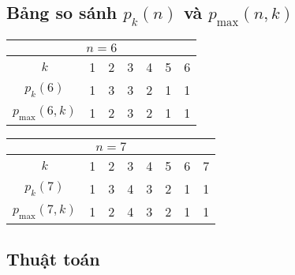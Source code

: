 \documentclass[12pt,a4paper]{article}
\theoremstyle{definition}
\begin{document}
\subsection{Bảng so sánh $p_k(n)$ và $p_{\max}(n,k)$}

\begin{center}
\begin{tabular}{|c|c|c|c|c|c|c|}
\hline
\multicolumn{7}{|c|}{$n = 6$} \\
\hline
$k$ & 1 & 2 & 3 & 4 & 5 & 6 \\
\hline
$p_k(6)$ & 1 & 3 & 3 & 2 & 1 & 1 \\
\hline
$p_{\max}(6,k)$ & 1 & 2 & 3 & 2 & 1 & 1 \\
\hline
\end{tabular}
\end{center}

\begin{center}
\begin{tabular}{|c|c|c|c|c|c|c|c|}
\hline
\multicolumn{8}{|c|}{$n = 7$} \\
\hline
$k$ & 1 & 2 & 3 & 4 & 5 & 6 & 7 \\
\hline
$p_k(7)$ & 1 & 3 & 4 & 3 & 2 & 1 & 1 \\
\hline
$p_{\max}(7,k)$ & 1 & 2 & 4 & 3 & 2 & 1 & 1 \\
\hline
\end{tabular}
\end{center}

\subsection{Thuật toán}
\end{document}
